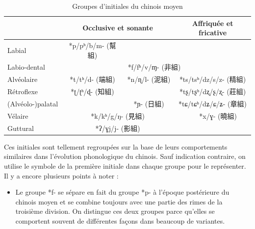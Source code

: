 \documentclass{scrbook}
\newcounter{c}[subsubsection]
\begin{document}
\begin{sloppypar}
\begin{table}[htbp]
  \centering
       \begin{tabular}{lcccc}
    \toprule
          & \multicolumn{2}{c}{Occlusive et sonante} & \multicolumn{2}{c}{Affriquée et fricative} \\
    \midrule
    Labial & \multicolumn{1}{c}{\cellcolor[rgb]{ .851,  .851,  .851}*p/pʰ/b/m- (幫組)} &       &       &  \\
    Labio-dental &       & \multicolumn{2}{c}{\cellcolor[rgb]{ .851,  .851,  .851}*f/fʰ/v/ɱ- (非組)} &  \\
    \midrule
    Alvéolaire & \multicolumn{1}{c}{\cellcolor[rgb]{ .851,  .851,  .851}*t/tʰ/d- (端組)} & \multicolumn{1}{c}{\cellcolor[rgb]{ .851,  .851,  .851}*n/ɳ/l- (泥組)} & \multicolumn{2}{c}{\cellcolor[rgb]{ .851,  .851,  .851}*ts/tsʰ/dz/s/z- (精組)} \\
    \midrule
    Rétroflexe & \multicolumn{1}{c}{\cellcolor[rgb]{ .851,  .851,  .851}*ʈ/ʈʰ/ɖ- (知組)} &       & \multicolumn{2}{c}{\cellcolor[rgb]{ .851,  .851,  .851}*tʂ/tʂʰ/dʐ/ʂ/ʐ- (莊組)} \\
    (Alvéolo-)palatal &       & \multicolumn{1}{c}{\cellcolor[rgb]{ .851,  .851,  .851}*ɲ- (日組)} & \multicolumn{2}{c}{\cellcolor[rgb]{ .851,  .851,  .851}*tɕ/tɕʰ/dʑ/ɕ/ʑ- (章組)} \\
    \midrule
    Vélaire & \multicolumn{2}{c}{\cellcolor[rgb]{ .851,  .851,  .851}*k/kʰ/g/ŋ- (見組)} &       & \multicolumn{1}{c}{\cellcolor[rgb]{ .851,  .851,  .851}*x/ɣ- (曉組)} \\
    Guttural & \multicolumn{2}{c}{\cellcolor[rgb]{ .851,  .851,  .851}*ʔ/ɣj/j- (影組)} &       &  \\
    \bottomrule
    \end{tabular}%
  \caption{Groupes d'initiales du chinois moyen}    
  \label{tab:groupe_initiale}%
\end{table}%
 
Ces initiales sont tellement regroupées sur la base de leurs comportements similaires dans l'évolution phonologique du chinois. Sauf indication contraire, on utilise le symbole de la première initiale dans chaque groupe pour le représenter. Il y a encore plusieurs points à noter : 

\begin{itemize}
\item{Le groupe *f- se sépare en fait du groupe *p- à l'époque postérieure du chinois moyen et se combine toujours avec une partie des rimes de la troisième division. On distingue ces deux groupes parce qu'elles se comportent souvent de différentes façons dans beaucoup de variantes.}


\end{itemize}
\end{sloppypar}
\end{document}
